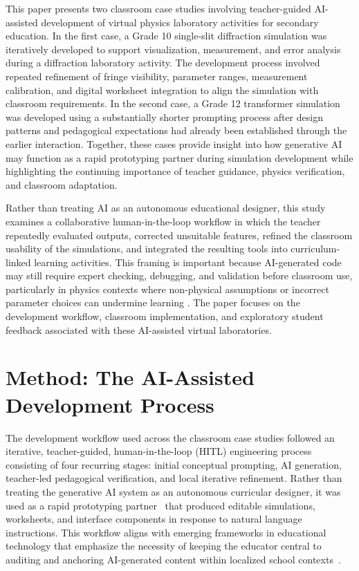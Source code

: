 \documentclass{iopjournal}
\begin{document}
This paper presents two classroom case studies involving teacher-guided AI-assisted development of virtual physics laboratory activities for secondary education. In the first case, a Grade 10 single-slit diffraction simulation was iteratively developed to support visualization, measurement, and error analysis during a diffraction laboratory activity. The development process involved repeated refinement of fringe visibility, parameter ranges, measurement calibration, and digital worksheet integration to align the simulation with classroom requirements. In the second case, a Grade 12 transformer simulation was developed using a substantially shorter prompting process after design patterns and pedagogical expectations had already been established through the earlier interaction. Together, these cases provide insight into how generative AI may function as a rapid prototyping partner during simulation development while highlighting the continuing importance of teacher guidance, physics verification, and classroom adaptation.

Rather than treating AI as an autonomous educational designer, this study examines a collaborative human-in-the-loop workflow in which the teacher repeatedly evaluated outputs, corrected unsuitable features, refined the classroom usability of the simulations, and integrated the resulting tools into curriculum-linked learning activities. This framing is important because AI-generated code may still require expert checking, debugging, and validation before classroom use, particularly in physics contexts where non-physical assumptions or incorrect parameter choices can undermine learning \cite{huang2026,lazaros2026}. The paper focuses on the development workflow, classroom implementation, and exploratory student feedback associated with these AI-assisted virtual laboratories.

\section{Method: The AI-Assisted Development Process}

The development workflow used across the classroom case studies followed an iterative, teacher-guided, human-in-the-loop (HITL) engineering process consisting of four recurring stages: initial conceptual prompting, AI generation, teacher-led pedagogical verification, and local iterative refinement. Rather than treating the generative AI system as an autonomous curricular designer, it was used as a rapid prototyping partner~\cite{Gao2023} that produced editable simulations, worksheets, and interface components in response to natural language instructions. This workflow aligns with emerging frameworks in educational technology that emphasize the necessity of keeping the educator central to auditing and anchoring AI-generated content within localized school contexts~\cite{lazaros2026, techreport2023}.
\end{document}
